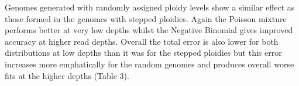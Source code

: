 \documentclass[11pt]{article}
\begin{document}
Genomes generated with randomly assigned ploidy levels show a similar effect as those formed in the genomes with stepped ploidies. Again the Poisson mixture performs better at very low depths whilst the Negative Binomial gives improved accuracy at higher read depths. Overall the total error is also lower for both distributions at low depths than it was for the stepped ploidies but this error increases more emphatically for the random genomes and produces overall worse fits at the higher depths (Table 3). 

%
\end{document}
